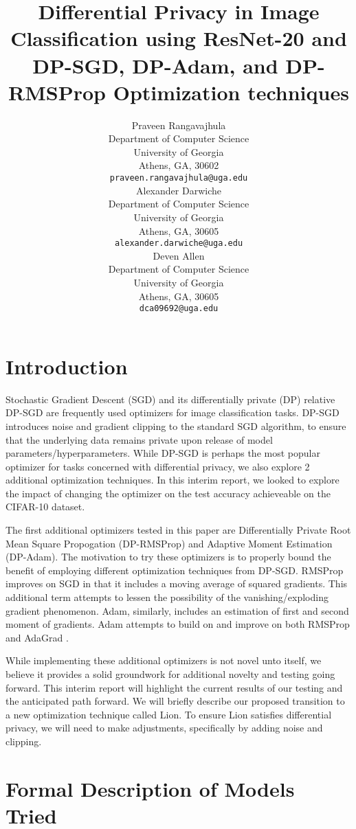 \documentclass{article}
\title{Differential Privacy in Image Classification using ResNet-20 and DP-SGD, DP-Adam, and DP-RMSProp Optimization techniques}
\author{
    Praveen Rangavajhula\\
    Department of Computer Science\\
    University of Georgia\\
    Athens, GA, 30602\\
    \texttt{praveen.rangavajhula@uga.edu} \\
    \And
    Alexander Darwiche\\
    Department of Computer Science\\
    University of Georgia\\
    Athens, GA, 30605 \\
    \texttt{alexander.darwiche@uga.edu} \\
    \And
    Deven Allen\\
    Department of Computer Science\\
    University of Georgia\\
    Athens, GA, 30605 \\
    \texttt{dca09692@uga.edu} \\
}
\begin{document}
    \maketitle


    \section{Introduction}\label{sec:introduction}
    
    Stochastic Gradient Descent (SGD) and its differentially private (DP) relative DP-SGD are frequently used optimizers for image classification tasks. DP-SGD
    introduces noise and gradient clipping to the standard SGD algorithm, to ensure that the underlying data remains private upon release of model parameters/hyperparameters. While DP-SGD
    is perhaps the most popular optimizer for tasks concerned with differential privacy, we also explore 2 additional optimization techniques. In this interim report, 
    we looked to explore the impact of changing the optimizer on the test accuracy achieveable on the CIFAR-10 dataset.
  
    The first additional optimizers tested in this paper are Differentially Private Root Mean Square Propogation (DP-RMSProp) and Adaptive Moment Estimation (DP-Adam). The motivation to try these optimizers is to properly bound
    the benefit of employing different optimization techniques from DP-SGD. RMSProp improves on SGD in that it includes a moving average of squared gradients. This additional term attempts to lessen the possibility of the
    vanishing/exploding gradient phenomenon. Adam, similarly, includes an estimation of first and second moment of gradients. Adam attempts to build on and improve on both RMSProp and AdaGrad \cite{kingma2017adammethodstochasticoptimization}.

    While implementing these additional optimizers is not novel unto itself, we believe it provides a solid groundwork for additional novelty and testing going forward. This interim report will
    highlight the current results of our testing and the anticipated path forward. We will briefly describe our proposed transition to a new optimization technique called Lion. To ensure Lion satisfies
    differential privacy, we will need to make adjustments, specifically by adding noise and clipping.

    \section{Formal Description of Models Tried}\label{sec:models}
    
\end{document}
